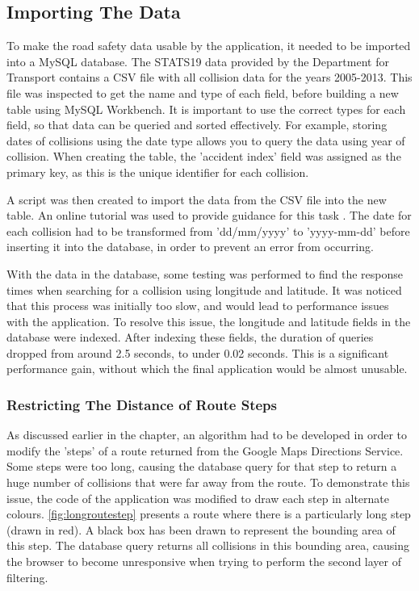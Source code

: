 \documentclass[authoryearcitations]{UoYCSproject}
\begin{document}
\subsection{Importing The Data}

To make the road safety data usable by the application, it needed to be imported into a MySQL database. The STATS19 data provided by the Department for Transport contains a CSV file with all collision data for the years 2005-2013. This file was inspected to get the name and type of each field, before building a new table using MySQL Workbench. It is important to use the correct types for each field, so that data can be queried and sorted effectively. For example, storing dates of collisions using the date type allows you to query the data using year of collision. When creating the table, the 'accident index' field was assigned as the primary key, as this is the unique identifier for each collision.

A script was then created to import the data from the CSV file into the new table. An online tutorial was used to provide guidance for this task \citep{MySQLTutorial}. The date for each collision had to be transformed from 'dd/mm/yyyy' to 'yyyy-mm-dd' before inserting it into the database, in order to prevent an error from occurring.

With the data in the database, some testing was performed to find the response times when searching for a collision using longitude and latitude. It was noticed that this process was initially too slow, and would lead to performance issues with the application. To resolve this issue, the longitude and latitude fields in the database were indexed. After indexing these fields, the duration of queries dropped from around 2.5 seconds, to under 0.02 seconds. This is a significant performance gain, without which the final application would be almost unusable.

\subsubsection{Restricting The Distance of Route Steps}

As discussed earlier in the chapter, an algorithm had to be developed in order to modify the 'steps' of a route returned from the Google Maps Directions Service. Some steps were too long, causing the database query for that step to return a huge number of collisions that were far away from the route. To demonstrate this issue, the code of the application was modified to draw each step in alternate colours. \autoref{fig:longroutestep} presents a route where there is a particularly long step (drawn in red). A black box has been drawn to represent the bounding area of this step. The database query returns all collisions in this bounding area, causing the browser to become unresponsive when trying to perform the second layer of filtering. 
\end{document}
